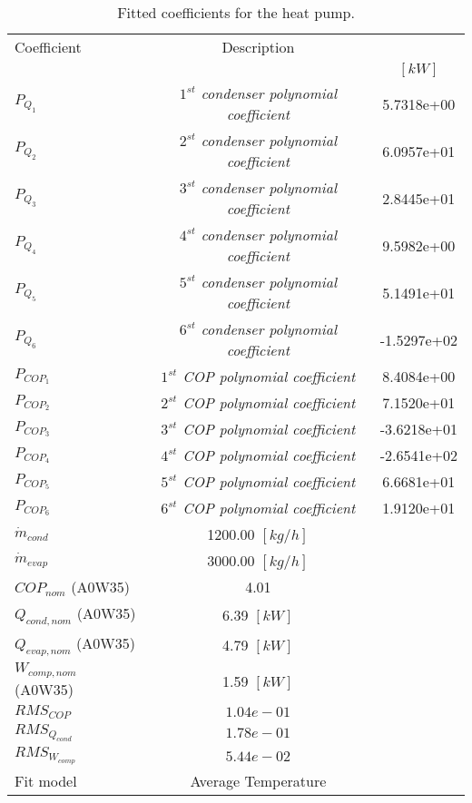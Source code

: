 \documentclass[english]{SPFShortReport}
\author{Dani Carbonell}
\begin{document}
\begin{table}[!ht]
\begin{small}
\caption{Fitted coefficients for the heat pump.}
\begin{center}
\resizebox{12cm}{!} 
{
\begin{tabular}{l | c c } 
\hline
\hline
Coefficient &Description & \\ 
 & &$[kW]$\\ 
\hline
$P_{Q_{1}}$ & \emph{$1^{st}$ condenser polynomial coefficient}  & 5.7318e+00    \\ 
$P_{Q_{2}}$ & \emph{$2^{st}$ condenser polynomial coefficient}  & 6.0957e+01    \\ 
$P_{Q_{3}}$ & \emph{$3^{st}$ condenser polynomial coefficient}  & 2.8445e+01    \\ 
$P_{Q_{4}}$ & \emph{$4^{st}$ condenser polynomial coefficient}  & 9.5982e+00    \\ 
$P_{Q_{5}}$ & \emph{$5^{st}$ condenser polynomial coefficient}  & 5.1491e+01    \\ 
$P_{Q_{6}}$ & \emph{$6^{st}$ condenser polynomial coefficient}  & -1.5297e+02    \\ 
\hline
$P_{COP_{1}}$ & \emph{$1^{st}$ COP polynomial coefficient}  & 8.4084e+00    \\ 
$P_{COP_{2}}$ & \emph{$2^{st}$ COP polynomial coefficient}  & 7.1520e+01    \\ 
$P_{COP_{3}}$ & \emph{$3^{st}$ COP polynomial coefficient}  & -3.6218e+01    \\ 
$P_{COP_{4}}$ & \emph{$4^{st}$ COP polynomial coefficient}  & -2.6541e+02    \\ 
$P_{COP_{5}}$ & \emph{$5^{st}$ COP polynomial coefficient}  & 6.6681e+01    \\ 
$P_{COP_{6}}$ & \emph{$6^{st}$ COP polynomial coefficient}  & 1.9120e+01    \\ 
\hline
$\dot m_{cond}$ & 1200.00 $[kg/h]$ \\ 
$\dot m_{evap}$ & 3000.00 $[kg/h]$ \\ 
\hline
$COP_{nom}$ (A0W35)& 4.01 \\ 
$Q_{cond,nom}$ (A0W35)& 6.39 $[kW]$\\ 
$Q_{evap,nom}$ (A0W35)& 4.79 $[kW]$\\ 
$W_{comp,nom}$ (A0W35)& 1.59 $[kW]$\\ 
\hline
 $RMS_{COP}$ & $1.04e-01$ \\ 
 $RMS_{Q_{cond}}$ & $1.78e-01$ \\ 
 $RMS_{W_{comp}}$ & $5.44e-02$ \\ 
\hline
Fit model & Average Temperature\\ 
\hline
\hline
\end{tabular}
}
\label{CoefTable}
\end{center}
\end{small}
\end{table}
\end{document}

